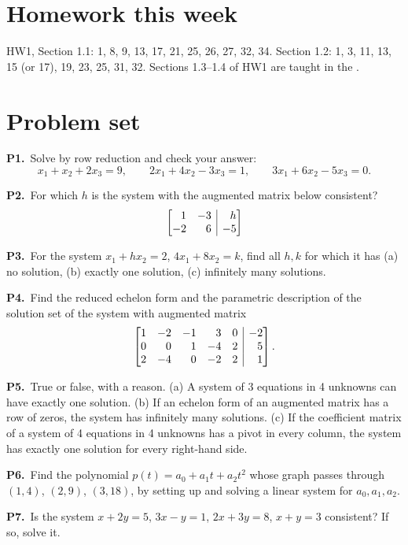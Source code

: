 \documentclass[10pt]{scrartcl}
\makeatletter
\newcommand{\aug}[2]{\left[\begin{array}{@{}#1@{}}#2\end{array}\right]}
\makeatother
\begin{document}
\section{Homework this week}
HW1, Section 1.1: 1, 8, 9, 13, 17, 21, 25, 26, 27, 32, 34. Section 1.2: 1, 3, 11, 13, 15 (or 17), 19, 23, 25, 31, 32. Sections 1.3--1.4 of HW1 are taught in the .

\section{Problem set}
\begin{prob}\textbf{P1.}\ Solve by row reduction and check your answer:
\[
  x_1+x_2+2x_3=9,\qquad 2x_1+4x_2-3x_3=1,\qquad 3x_1+6x_2-5x_3=0.
\]
\end{prob}
\begin{prob}\textbf{P2.}\ For which $h$ is the system with the augmented matrix below consistent?
\[
  \aug{rr|r}{1&-3&h\\-2&6&-5}
\]
\end{prob}
\begin{prob}\textbf{P3.}\ For the system $x_1+hx_2=2$, $4x_1+8x_2=k$, find all $h,k$ for which it has (a) no solution, (b) exactly one solution, (c) infinitely many solutions.
\end{prob}
\begin{prob}\textbf{P4.}\ Find the reduced echelon form and the parametric description of the solution set of the system with augmented matrix
\[
  \aug{rrrrr|r}{1&-2&-1&3&0&-2\\0&0&1&-4&2&5\\2&-4&0&-2&2&1}.
\]
\end{prob}
\begin{prob}\textbf{P5.}\ True or false, with a reason. (a) A system of 3 equations in 4 unknowns can have exactly one solution. (b) If an echelon form of an augmented matrix has a row of zeros, the system has infinitely many solutions. (c) If the coefficient matrix of a system of 4 equations in 4 unknowns has a pivot in every column, the system has exactly one solution for every right-hand side.
\end{prob}
\begin{prob}\textbf{P6.}\ Find the polynomial $p(t)=a_0+a_1t+a_2t^2$ whose graph passes through $(1,4)$, $(2,9)$, $(3,18)$, by setting up and solving a linear system for $a_0,a_1,a_2$.
\end{prob}
\begin{prob}\textbf{P7.}\ Is the system $x+2y=5$, $3x-y=1$, $2x+3y=8$, $x+y=3$ consistent? If so, solve it.
\end{prob}
\end{document}
